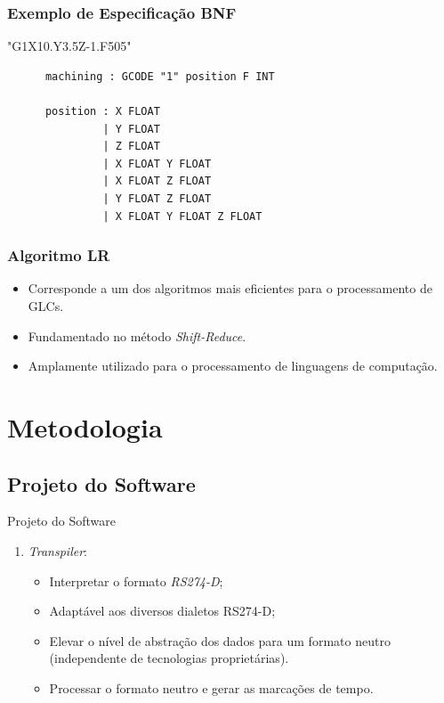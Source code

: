 \documentclass[aspectratio=169]{beamer}
\begin{document}
{\begin{frame}
\end{frame}


\begin{frame}[fragile]
  \frametitle{Exemplo de Especificação BNF}
  \begin{example}
   "G1X10.Y3.5Z-1.F505"
    \begin{lstlisting}
      machining : GCODE "1" position F INT

      position : X FLOAT
               | Y FLOAT
               | Z FLOAT
               | X FLOAT Y FLOAT
               | X FLOAT Z FLOAT
               | Y FLOAT Z FLOAT
               | X FLOAT Y FLOAT Z FLOAT
    \end{lstlisting}
  \end{example}  
\end{frame}


\begin{frame}
  \frametitle{Algoritmo LR}
  \begin{itemize}
    \item Corresponde a um dos algoritmos mais eficientes para o 
          processamento de GLCs.
    \item Fundamentado no método \emph{Shift-Reduce}.
    \item Amplamente utilizado para o processamento de linguagens de 
          computação.
  \end{itemize}

\end{frame}


\section{Metodologia}

\subsection{Projeto do Software}

\begin{frame}{Projeto do Software}
  \begin{enumerate}
    \item {
      \emph{Transpiler}: 
      \begin{itemize}
        \item Interpretar o formato \emph{RS274-D};
        \item Adaptável aos diversos dialetos RS274-D;
        \item Elevar o nível de abstração dos dados para um formato 
              neutro (independente de tecnologias proprietárias).
        \item Processar o formato neutro e gerar as marcações de tempo.
      \end{itemize}
    }


\end{enumerate}
\end{frame}}
\end{document}
